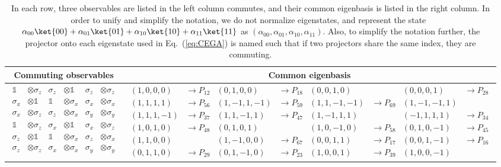 \documentclass[english,reprint, aps, prl,superscriptaddress, showpacs,
showkeys, longbibliography, amsmath, amssymb]{revtex4-1}
\theoremstyle{plain}
\theoremstyle{definition}
\begin{document}
\begin{table*}
\caption{\label{table:commonBasis}In each row, three observables are listed
in the left column commutes, and their common eigenbasis is listed
in the right column. In order to unify and simplify the notation,
we do not normalize eigenstates, and represent the state~$\alpha_{00}\ket{00}+\alpha_{01}\ket{01}+\alpha_{10}\ket{10}+\alpha_{11}\ket{11}$
as $\left(\alpha_{00},\alpha_{01},\alpha_{10},\alpha_{11}\right)$.
Also, to simplify the notation further, the projector onto each eigenstate
used in Eq.~(\ref{eq:CEGA}) is named such that if two projectors
share the same index, they are commuting.}

\begin{ruledtabular}
\begin{tabular}{c|c}
Commuting observables & Common eigenbasis\tabularnewline
\hline 
$\begin{aligned}\mathbb{1} & \otimes\sigma_{z} & \sigma_{z} & \otimes\mathbb{1} & \sigma_{z} & \otimes\sigma_{z}\\
\sigma_{x} & \otimes\mathbb{1} & \mathbb{1} & \otimes\sigma_{x} & \sigma_{x} & \otimes\sigma_{x}\\
\sigma_{x} & \otimes\sigma_{z} & \sigma_{z} & \otimes\sigma_{x} & \sigma_{y} & \otimes\sigma_{y}\\
\mathbb{1} & \otimes\sigma_{z} & \sigma_{x} & \otimes\mathbb{1} & \sigma_{x} & \otimes\sigma_{z}\\
\sigma_{z} & \otimes\mathbb{1} & \mathbb{1} & \otimes\sigma_{x} & \sigma_{z} & \otimes\sigma_{x}\\
\sigma_{z} & \otimes\sigma_{z} & \sigma_{x} & \otimes\sigma_{x} & \sigma_{y} & \otimes\sigma_{y}
\end{aligned}
$ & $\begin{aligned}(1,0,0,0) & \rightarrow P_{12} & (0,1,0,0) & \rightarrow P_{18} & (0,0,1,0) &  & (0,0,0,1) & \rightarrow P_{28}\\
(1,1,1,1) & \rightarrow P_{56} & (1,-1,1,-1) & \rightarrow P_{59} & (1,1,-1,-1) & \rightarrow P_{69} & (1,-1,-1,1)\\
(1,1,1,-1) & \rightarrow P_{37} & (1,1,-1,1) & \rightarrow P_{47} & (1,-1,1,1) &  & (-1,1,1,1) & \rightarrow P_{34}\\
(1,0,1,0) & \rightarrow P_{48} & (0,1,0,1) &  & (1,0,-1,0) & \rightarrow P_{58} & (0,1,0,-1) & \rightarrow P_{45}\\
(1,1,0,0) &  & (1,-1,0,0) & \rightarrow P_{67} & (0,0,1,1) & \rightarrow P_{17} & (0,0,1,-1) & \rightarrow P_{16}\\
(0,1,1,0) & \rightarrow P_{29} & (0,1,-1,0) & \rightarrow P_{23} & (1,0,0,1) & \rightarrow P_{39} & (1,0,0,-1)
\end{aligned}
$\tabularnewline
\end{tabular}
\end{ruledtabular}

\end{table*}
\end{document}
